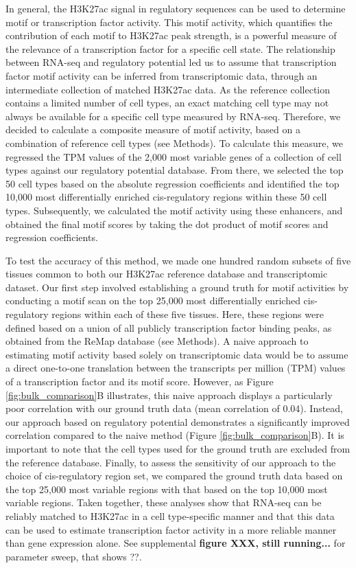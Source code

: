 In general, the H3K27ac signal in regulatory sequences can be used to determine motif or transcription factor activity\cite{FANTOM2009,Balwierz2014,Madsen_2017}. This motif activity, which quantifies the contribution of each motif to H3K27ac peak strength, is a powerful measure of the relevance of a transcription factor for a specific cell state. The relationship between RNA-seq and regulatory potential led us to assume that transcription factor motif activity can be inferred from transcriptomic data, through an intermediate collection of matched H3K27ac data. As the reference collection contains a limited number of cell types, an exact matching cell type may not always be available for a specific cell type measured by RNA-seq. Therefore, we decided to calculate a composite measure of motif activity, based on a combination of reference cell types (see Methods). To calculate this measure, we regressed the TPM values of the 2,000 most variable genes of a collection of cell types against our regulatory potential database. From there, we selected the top 50 cell types based on the absolute regression coefficients and identified the top 10,000 most differentially enriched cis-regulatory regions within these 50 cell types. Subsequently, we calculated the motif activity using these enhancers, and obtained the final motif scores by taking the dot product of motif scores and regression coefficients. 

To test the accuracy of this method, we made one hundred random subsets of five tissues common to both our H3K27ac reference database and transcriptomic dataset. Our first step involved establishing a ground truth for motif activities by conducting a motif scan on the top 25,000 most differentially enriched cis-regulatory regions within each of these five tissues. Here, these regions were defined based on a union of all publicly transcription factor binding peaks, as obtained from the ReMap database\cite{Chneby2017} (see Methods). A naive approach to estimating motif activity based solely on transcriptomic data would be to assume a direct one-to-one translation between the transcripts per million (TPM) values of a transcription factor and its motif score. However, as Figure \ref{fig:bulk_comparison}B illustrates, this naive approach displays a particularly poor correlation with our ground truth data (mean correlation of 0.04). Instead, our approach based on regulatory potential demonstrates a significantly improved correlation compared to the naive method (Figure \ref{fig:bulk_comparison}B). It is important to note that the cell types used for the ground truth are excluded from the reference database. Finally, to assess the sensitivity of our approach to the choice of cis-regulatory region set, we compared the ground truth data based on the top 25,000 most variable regions with that based on the top 10,000 most variable regions. Taken together, these analyses show that RNA-seq can be reliably matched to H3K27ac in a cell type-specific manner and that this data can be used to estimate transcription factor activity in a more reliable manner than gene expression alone. See supplemental \textbf{figure XXX, still running...} for parameter sweep, that shows ??. 

